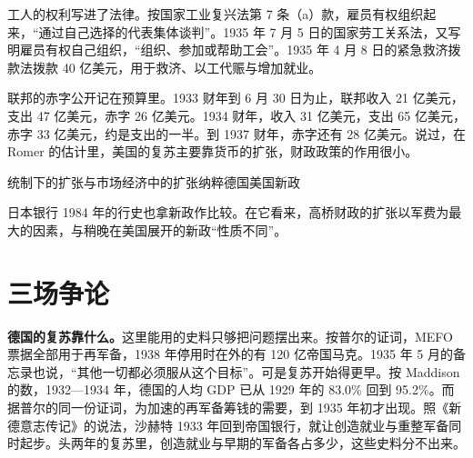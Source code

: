 工人的权利写进了法律。按国家工业复兴法第 7 条（a）款，雇员有权组织起来，“通过自己选择的代表集体谈判”\cite{nira1933}。1935 年 7 月 5 日的国家劳工关系法，又写明雇员有权自己组织，“组织、参加或帮助工会”\cite{nlra1935}。1935 年 4 月 8 日的紧急救济拨款法拨款 40 亿美元，用于救济、以工代赈与增加就业\cite{era1935}。

联邦的赤字公开记在预算里。1933 财年到 6 月 30 日为止，联邦收入 21 亿美元，支出 47 亿美元，赤字 26 亿美元\cite{census1975y}。1934 财年，收入 31 亿美元，支出 65 亿美元，赤字 33 亿美元，约是支出的一半\cite{census1975y}。到 1937 财年，赤字还有 28 亿美元\cite{census1975y}。说过，在 Romer 的估计里，美国的复苏主要靠货币的扩张，财政政策的作用很小。

\begin{compare}{统制下的扩张与市场经济中的扩张}{纳粹德国}{美国新政}
\end{compare}

日本银行 1984 年的行史也拿新政作比较。在它看来，高桥财政的扩张以军费为最大的因素，与稍晚在美国展开的新政“性质不同”\cite{boj1984}。

\section{三场争论}\label{sec:alternatives-debate}

\textbf{德国的复苏靠什么。}这里能用的史料只够把问题摆出来。按普尔的证词，MEFO 票据全部用于再军备，1938 年停用时在外的有 120 亿帝国马克\cite{nca1946g}。1935 年 5 月的备忘录也说，“其他一切都必须服从这个目标”\cite{nca1946b}。可是复苏开始得更早。按 Maddison 的数，1932—1934 年，德国的人均 GDP 已从 1929 年的 83.0\% 回到 95.2\%\cite{mpd2023}。而据普尔的同一份证词，为加速的再军备筹钱的需要，到 1935 年初才出现\cite{nca1946g}。照《新德意志传记》的说法，沙赫特 1933 年回到帝国银行，就让创造就业与重整军备同时起步\cite{schacht2005}。头两年的复苏里，创造就业与早期的军备各占多少，这些史料分不出来。

